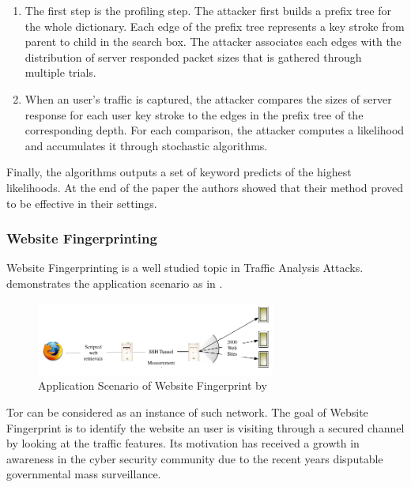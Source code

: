 \begin{enumerate}
	\item The first step is the profiling step. The attacker first builds a prefix tree\cite{PrefixTree} for the whole dictionary. Each edge of the prefix tree represents a key stroke from parent to child in the search box. The attacker associates each edges with the distribution of server responded packet sizes that is gathered through multiple trials. 
	\item When an user's traffic is captured, the attacker compares the sizes of server response for each user key stroke to the edges in the prefix tree of the corresponding depth. For each comparison, the attacker computes a likelihood and accumulates it through stochastic algorithms. 
\end{enumerate}

Finally, the algorithms outputs a set of keyword predicts of the highest likelihoods. At the end of the paper the authors showed that their method proved to be effective in their settings.

\subsubsection{Website Fingerprinting}
Website Fingerprinting is a well studied topic in Traffic Analysis Attacks. \cite{WebsiteFingerprint} demonstrates the application scenario as in . 

\begin{figure}[th!]
	\centering
	\includegraphics[width=0.7\textwidth]{fig/WebsiteFingerprint.png}
	\caption{Application Scenario of Website Fingerprint by \cite{WebsiteFingerprint}}
	\label{Fig: Application Scenario of Website Fingerprint}
\end{figure}

Tor\cite{Tor} can be considered as an instance of such network. The goal of Website Fingerprint is to identify the website an user is visiting through a secured channel by looking at the traffic features. Its motivation has received a growth in awareness in the cyber security community due to the recent years disputable governmental mass surveillance.

